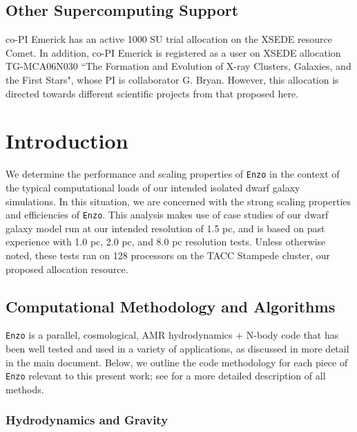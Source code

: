 \documentclass[11pt]{article}
\begin{document}

\subsection{Other Supercomputing Support}
 
co-PI Emerick has an active 1000 SU trial allocation on the XSEDE resource Comet. In addition, co-PI Emerick is registered as a user on XSEDE allocation TG-MCA06N030 ``The Formation and Evolution of X-ray Clusters, Galaxies, and the First Stars", whose PI is collaborator G. Bryan. However, this allocation is directed towards different scientific projects from that proposed here.
\clearpage
\appendix

\section{Introduction}

We determine the performance and scaling properties of \texttt{Enzo} in the context of the typical computational loads of our intended isolated dwarf galaxy simulations. In this situation, we are concerned with the strong scaling properties and efficiencies of \texttt{Enzo}. This analysis makes use of case studies of our dwarf galaxy model run at our intended resolution of 1.5 pc, and is based on past experience with 1.0 pc, 2.0 pc, and 8.0 pc resolution tests. Unless otherwise noted, these tests ran on 128 processors on the TACC Stampede cluster, our proposed allocation resource.

\subsection{Computational Methodology and Algorithms}

\texttt{Enzo} is a parallel, cosmological, AMR hydrodynamics + N-body code that has been well tested and used in a variety of applications, as discussed in more detail in the main document. Below, we outline the code methodology for each piece of \texttt{Enzo} relevant to this present work; see \cite{Enzo2014} for a more detailed description of all methods. 

\subsubsection{Hydrodynamics and Gravity}
\end{document}
